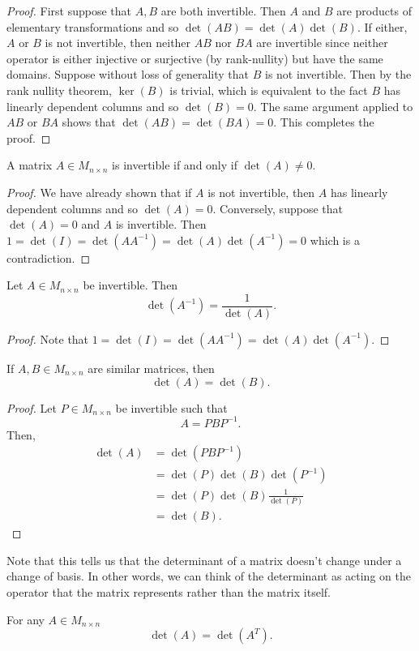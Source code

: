 \begin{proof}
First suppose that $A,B$ are both invertible. Then $A$ and $B$
are products of elementary transformations and so $\det\left(AB\right)=\det\left(A\right)\det\left(B\right).$
If either, $A$ or $B$ is not invertible, then neither $AB$ nor
$BA$ are invertible since neither operator is either injective or
surjective (by rank-nullity) but have the same domains. Suppose without
loss of generality that $B$ is not invertible. Then by the rank nullity
theorem, $\ker\left(B\right)$ is trivial, which is equivalent to
the fact $B$ has linearly dependent columns and so $\det\left(B\right)=0$.
The same argument applied to $AB$ or $BA$ shows that $\det\left(AB\right)=\det\left(BA\right)=0.$
This completes the proof.
\end{proof}
\begin{cor}
\label{cor:invertibleDetZero}A matrix $A\in M_{n\times n}$ is invertible
if and only if $\det\left(A\right)\neq0.$
\end{cor}

\begin{proof}
We have already shown that if $A$ is not invertible, then $A$ has
linearly dependent columns and so $\det\left(A\right)=0.$ Conversely,
suppose that $\det\left(A\right)=0$ and $A$ is invertible. Then
$1=\det\left(I\right)=\det\left(AA^{-1}\right)=\det\left(A\right)\det\left(A^{-1}\right)=0$
which is a contradiction.
\end{proof}
\begin{cor}
\label{cor:detOfInverse}Let $A\in M_{n\times n}$ be invertible.
Then
\[
\det\left(A^{-1}\right)=\frac{1}{\det\left(A\right)}.
\]
\end{cor}

\begin{proof}
Note that $1=\det\left(I\right)=\det\left(AA^{-1}\right)=\det\left(A\right)\det\left(A^{-1}\right).$
\end{proof}
%
\begin{cor}
\label{cor:detBasisInvariance}If $A,B\in M_{n\times n}$ are similar
matrices, then 
\[
\det\left(A\right)=\det\left(B\right).
\]
\end{cor}

\begin{proof}
Let $P\in M_{n\times n}$ be invertible such that 
\[
A=PBP^{-1}.
\]
Then, 
\begin{align*}
\det\left(A\right) & =\det\left(PBP^{-1}\right)\\
 & =\det\left(P\right)\det\left(B\right)\det\left(P^{-1}\right)\\
 & =\det\left(P\right)\det\left(B\right)\frac{1}{\det\left(P\right)}\\
 & =\det\left(B\right).
\end{align*}
\end{proof}
Note that this tells us that the determinant of a matrix doesn't change
under a change of basis. In other words, we can think of the determinant
as acting on the operator that the matrix represents rather than the
matrix itself.
\begin{prop}
\label{prop:detTranspose}For any $A\in M_{n\times n}$
\[
\det\left(A\right)=\det\left(A^{T}\right).
\]
\end{prop}

